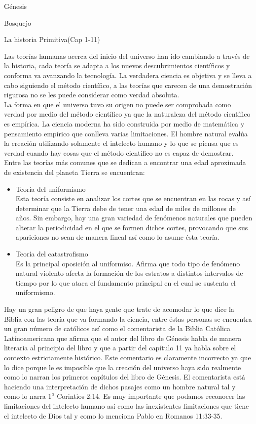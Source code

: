 \begin{section}{Génesis}
\begin{subsection}{Bosquejo}
\begin{subsubsection}{La historia Primitiva(Cap 1-11)}
\begin{enumerate}
\begin{itemize}
Las teorías humanas acerca del inicio del universo han ido cambiando a través de la historia, cada teoría se adapta a los nuevos descubrimientos científicos y conforma va avanzando la tecnología. La verdadera ciencia es objetiva y se lleva a cabo siguiendo el método científico, a las teorías que carecen de una demostración rigurosa no se les puede considerar como verdad absoluta.\\
La forma en que el universo tuvo su origen no puede ser comprobada como verdad por medio del método científico ya que la naturaleza del método científico es empírica. La ciencia moderna ha sido construida por medio de matemática y pensamiento empírico que conlleva varias limitaciones. El hombre natural evalúa la creación utilizando solamente el intelecto humano y lo que se piensa que es verdad cuando hay cosas que el método científico no es capaz de demostrar.\\
Entre las teorías más comunes que se dedican a encontrar una edad aproximada de existencia del planeta Tierra se encuentran:
\begin{itemize}
\item Teoría del uniformismo\\
	Esta teoría consiste en analizar los cortes que se encuentran en las rocas y así determinar que la Tierra debe de tener una edad de miles de millones de años. Sin embargo, hay una gran variedad de fenómenos naturales que pueden alterar la periodicidad en el que se formen dichos cortes, provocando que sus apariciones no sean de manera lineal así como lo asume ésta teoría.
\item Teoría del catastrofismo\\
	Es la principal oposición al uniformiso. Afirma que todo tipo de fenómeno natural violento afecta la formación de los estratos a distintos intervalos de tiempo por lo que ataca el fundamento principal en el cual se sustenta el uniformismo.
	\end{itemize}
Hay un gran peligro de que haya gente que trate de acomodar lo que dice la Biblia con las teoría que va formando la ciencia, entre éstas personas se encuentra un gran número de católicos así como el comentarista de la Biblia Católica Latinoamericana que afirma que el autor del libro de Génesis habla de manera literaria al principio del libro y que a partir del capítulo 11 ya habla sobre el contexto estrictamente histórico.\newpage
Este comentario es claramente incorrecto ya que lo dice porque le es imposible que la creación del universo haya sido realmente como lo narran los primeros capítulos del libro de Génesis. El comentarista está haciendo una interpretación de dichos pasajes como un hombre natural tal y como lo narra $1^a$ Corintios 2:14. Es muy importante que podamos reconocer las limitaciones del intelecto humano así como las inexistentes limitaciones que tiene el intelecto de Dios tal y como lo menciona Pablo en Romanos 11:33-35.



\end{itemize}
\end{enumerate}
\end{subsubsection}
\end{subsection}
\end{section}
